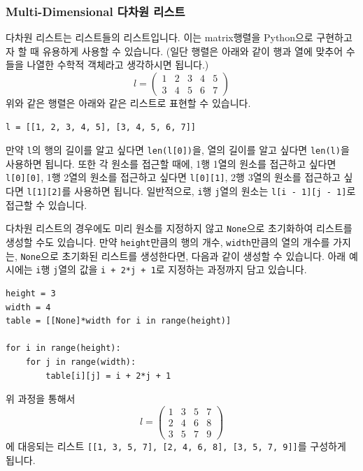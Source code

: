 \documentclass[../main.tex]{subfiles}
\begin{document}
\subsubsection{Multi-Dimensional 다차원 리스트}
다차원 리스트는 리스트들의 리스트입니다.
이는 matrix행렬을 Python으로 구현하고자 할 때 유용하게 사용할 수 있습니다.
(일단 행렬은 아래와 같이 행과 열에 맞추어 수들을 나열한 수학적 객체라고 생각하시면 됩니다.)
\[
l =
  \begin{pmatrix}
    1 & 2 & 3 & 4 & 5 \\
    3 & 4 & 5 & 6 & 7
  \end{pmatrix}
\]
위와 같은 행렬은 아래와 같은 리스트로 표현할 수 있습니다.
\begin{verbatim}
l = [[1, 2, 3, 4, 5], [3, 4, 5, 6, 7]]
\end{verbatim}
만약 \texttt{l}의 행의 길이를 알고 싶다면 \texttt{len(l[0])}을, 열의 길이를 알고 싶다면 \texttt{len(l)}을 사용하면 됩니다.
또한 각 원소를 접근할 때에, 1행 1열의 원소를 접근하고 싶다면 \texttt{l[0][0]}, 1행 2열의 원소를 접근하고 싶다면 \texttt{l[0][1]}, 2행 3열의 원소를 접근하고 싶다면 \texttt{l[1][2]}를 사용하면 됩니다.
일반적으로, \texttt{i}행 \texttt{j}열의 원소는 \texttt{l[i - 1][j - 1]}로 접근할 수 있습니다.

다차원 리스트의 경우에도 미리 원소를 지정하지 않고 \texttt{None}으로 초기화하여 리스트를 생성할 수도 있습니다.
만약 \texttt{height}만큼의 행의 개수, \texttt{width}만큼의 열의 개수를 가지는, \texttt{None}으로 초기화된 리스트를 생성한다면, 다음과 같이 생성할 수 있습니다.
아래 예시에는 \texttt{i}행 \texttt{j}열의 값을 \texttt{i + 2*j + 1}로 지정하는 과정까지 담고 있습니다.
\begin{verbatim}
height = 3
width = 4
table = [[None]*width for i in range(height)]

for i in range(height):
	for j in range(width):
		table[i][j] = i + 2*j + 1
\end{verbatim}
위 과정을 통해서 
\[
l =
  \begin{pmatrix}
    1 & 3 & 5 & 7\\
    2 & 4 & 6 & 8\\
    3 & 5 & 7 & 9
  \end{pmatrix}
\]
에 대응되는 리스트 \texttt{[[1, 3, 5, 7], [2, 4, 6, 8], [3, 5, 7, 9]]}를 구성하게 됩니다.
\end{document}
